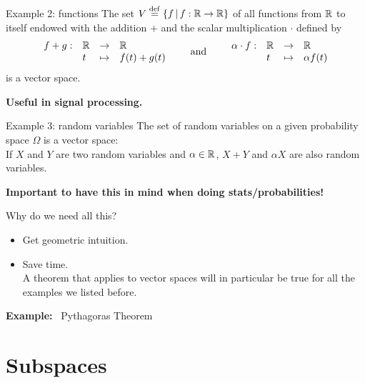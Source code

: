 \documentclass{beamer}
\begin{document}
\begin{frame}[t]{Example 2: functions}
	The set \quad $V \overset{\rm def}{=} \{ f \, | \, f: \mathbb{R} \to \mathbb{R} \}$ \quad of all functions from $\mathbb{R}$ to itself endowed with the addition $+$ and the scalar multiplication $\cdot$ defined by
	$$
	\begin{array}{rlll}
		f+g :& \mathbb{R} & \to & \mathbb{R} \\
			 &t & \mapsto & f(t) + g(t)
	\end{array}
	\qquad
	\text{and}
	\qquad
	\begin{array}{rlll}
		\alpha \cdot f :& \mathbb{R} & \to & \mathbb{R} \\
						&t & \mapsto & \alpha f(t)
	\end{array}
	$$
	is a vector space.
	\vspace{3cm}
	\begin{center}
		\textbf{Useful in signal processing.}
	\end{center}
\end{frame}

\begin{frame}{Example 3: random variables}
	The set of random variables on a given probability space $\Omega$ is a vector space: 
	\\
	If $X$ and $Y$ are two random variables and $\alpha \in \mathbb{R}$, $X+Y$ and $\alpha X$ are also random variables.

	\vspace{0.8cm}
	\begin{center}
		\textbf{Important to have this in mind when doing stats/probabilities!}
	\end{center}
\end{frame}

\begin{frame}[t]{Why do we need all this?}
	\begin{itemize}
		\item Get geometric intuition. 
			\vspace{0.2cm}
		\item Save time. 
			\\
			A theorem that applies to vector spaces will in particular be true for all the examples we listed before.
	\end{itemize}
	\vspace{0.2cm}
	\textbf{Example:} \ Pythagoras Theorem
\end{frame}

\section{Subspaces}
\end{document}
